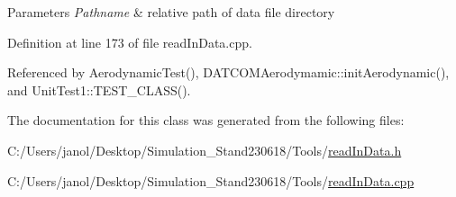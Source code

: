\begin{DoxyParams}{Parameters}
{\em Pathname} & relative path of data file directory \\
\hline
\end{DoxyParams}


Definition at line 173 of file read\+In\+Data.\+cpp.



Referenced by Aerodynamic\+Test(), D\+A\+T\+C\+O\+M\+Aerodymamic\+::init\+Aerodynamic(), and Unit\+Test1\+::\+T\+E\+S\+T\+\_\+\+C\+L\+A\+S\+S().



The documentation for this class was generated from the following files\+:\begin{DoxyCompactItemize}
\item 
C\+:/\+Users/janol/\+Desktop/\+Simulation\+\_\+\+Stand230618/\+Tools/\hyperlink{read_in_data_8h}{read\+In\+Data.\+h}\item 
C\+:/\+Users/janol/\+Desktop/\+Simulation\+\_\+\+Stand230618/\+Tools/\hyperlink{read_in_data_8cpp}{read\+In\+Data.\+cpp}\end{DoxyCompactItemize}
